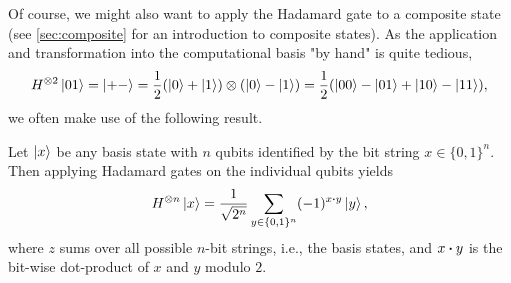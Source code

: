 				Of course, we might also want to apply the Hadamard gate to a composite state (see \autoref{sec:composite} for an introduction to composite states). As the application and transformation into the computational basis "by hand" is quite tedious,
				\begin{equation}
					H^{\otimes 2} \ket{01}
						= \ket{+-}
						= \frac{1}{2} (\ket{0} + \ket{1}) \otimes (\ket{0} - \ket{1})
						= \frac{1}{2} (\ket{00} - \ket{01} + \ket{10} - \ket{11}),
				\end{equation}
				we often make use of the following result.
				\begin{theorem}  \label{th:hadamardGate}
					Let \(\ket{x}\) be any basis state with \(n\) qubits identified by the bit string \( x \in \{ 0, 1 \}^n \). Then applying Hadamard gates on the individual qubits yields
					\begin{equation}
						H^{\otimes n} \ket{x} = \frac{1}{\sqrt{2^n}} \sum_{y \in \{ 0, 1 \}^n} (-1)^{x \dotproduct y} \ket{y},
					\end{equation}
					where \(z\) sums over all possible \(n\)-bit strings, i.e., the basis states, and \( x \dotproduct y \) is the bit-wise dot-product of \(x\) and \(y\) modulo \(2\).
				\end{theorem}
